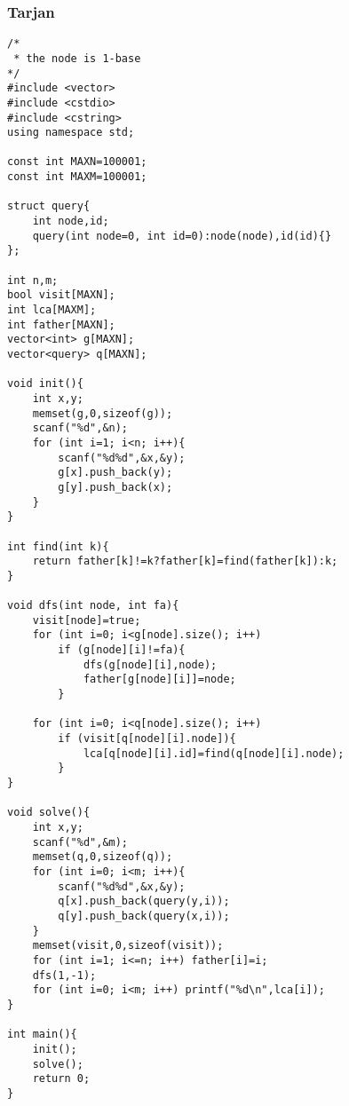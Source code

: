 \subsubsection{Tarjan}
\begin{verbatim}
/*
 * the node is 1-base
*/
#include <vector>
#include <cstdio>
#include <cstring>
using namespace std;

const int MAXN=100001;
const int MAXM=100001;

struct query{
    int node,id;
    query(int node=0, int id=0):node(node),id(id){}
};

int n,m;
bool visit[MAXN];
int lca[MAXM];
int father[MAXN];
vector<int> g[MAXN];
vector<query> q[MAXN];

void init(){
    int x,y;
    memset(g,0,sizeof(g));
    scanf("%d",&n);
    for (int i=1; i<n; i++){
        scanf("%d%d",&x,&y);
        g[x].push_back(y);
        g[y].push_back(x);
    }
}

int find(int k){
    return father[k]!=k?father[k]=find(father[k]):k;
}

void dfs(int node, int fa){
    visit[node]=true;
    for (int i=0; i<g[node].size(); i++)
        if (g[node][i]!=fa){
            dfs(g[node][i],node);
            father[g[node][i]]=node;
        }

    for (int i=0; i<q[node].size(); i++)
        if (visit[q[node][i].node]){
            lca[q[node][i].id]=find(q[node][i].node);
        }
}

void solve(){
    int x,y;
    scanf("%d",&m);
    memset(q,0,sizeof(q));
    for (int i=0; i<m; i++){
        scanf("%d%d",&x,&y);
        q[x].push_back(query(y,i));
        q[y].push_back(query(x,i));
    }
    memset(visit,0,sizeof(visit));
    for (int i=1; i<=n; i++) father[i]=i;
    dfs(1,-1);
    for (int i=0; i<m; i++) printf("%d\n",lca[i]);
}

int main(){
    init();
    solve();
    return 0;
}
\end{verbatim}
